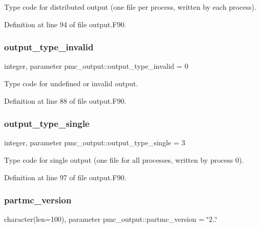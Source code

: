 Type code for distributed output (one file per process, written by each process). 



Definition at line 94 of file output.\+F90.

\mbox{\label{namespacepmc__output_a3802b8c5d6df146ecc2dd6d5094b122f}} 
\subsubsection{\texorpdfstring{output\+\_\+type\+\_\+invalid}{output\_type\_invalid}}
{\footnotesize\ttfamily integer, parameter pmc\+\_\+output\+::output\+\_\+type\+\_\+invalid = 0}



Type code for undefined or invalid output. 



Definition at line 88 of file output.\+F90.

\mbox{\label{namespacepmc__output_af747821e7522d6b0c5217faa79fc1b01}} 
\subsubsection{\texorpdfstring{output\+\_\+type\+\_\+single}{output\_type\_single}}
{\footnotesize\ttfamily integer, parameter pmc\+\_\+output\+::output\+\_\+type\+\_\+single = 3}



Type code for single output (one file for all processes, written by process 0). 



Definition at line 97 of file output.\+F90.

\mbox{\label{namespacepmc__output_a5e58f12b9a77a18071fb7de24524848f}} 
\subsubsection{\texorpdfstring{partmc\+\_\+version}{partmc\_version}}
{\footnotesize\ttfamily character(len=100), parameter pmc\+\_\+output\+::partmc\+\_\+version = \char`\"{}2..\char`\"{}}




